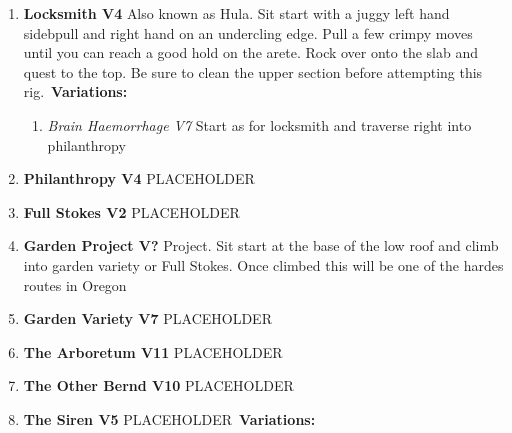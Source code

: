 \begin{enumerate}[resume]
	\item\label{rt:Locksmith} \colorbox{RoyalBlue!20}{\textbf{Locksmith V4       \warn \warn } }
	\newline Also known as Hula. Sit start with a juggy left hand sidebpull and right hand on an undercling edge. Pull a few crimpy moves until you can reach a good hold on the arete. Rock over onto the slab and quest to the top. Be sure to clean the upper section before attempting this rig.\
	\newline \textbf{Variations:}
	\begin{enumerate}
		\item\label{vr:Brain Haemorrhage} \colorbox{Goldenrod!50}{\emph{Brain Haemorrhage V7  }  }
		\newline Start as for locksmith and traverse right into philanthropy\
	\end{enumerate}
	\item\label{rt:Philanthropy} \colorbox{RoyalBlue!20}{\textbf{Philanthropy V4  } }
	\newline PLACEHOLDER\
	\item\label{rt:Full Stokes} \colorbox{green!20}{\textbf{Full Stokes V2  } }
	\newline PLACEHOLDER\
	\item\label{rt:Garden Project} \colorbox{black!20}{\textbf{Garden Project V?  } }
	\newline Project. Sit start at the base of the low roof and climb into garden variety or Full Stokes. Once climbed this will be one of the hardes routes in Oregon\
	\item\label{rt:Garden Variety} \colorbox{Goldenrod!50}{\textbf{Garden Variety V7  } }
	\newline PLACEHOLDER\
	\item\label{rt:The Arboretum} \colorbox{red!20}{\textbf{The Arboretum V11  } }
	\newline PLACEHOLDER\
	\item\label{rt:The Other Bernd} \colorbox{red!20}{\textbf{The Other Bernd V10  } }
	\newline PLACEHOLDER\
	\item\label{rt:The Siren} \colorbox{RoyalBlue!20}{\textbf{The Siren V5       } }
	\newline PLACEHOLDER\
	\newline \textbf{Variations:}
	\begin{enumerate}

\end{enumerate}
\end{enumerate}
